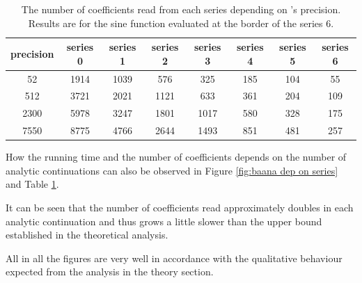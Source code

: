     \begin{table}
      \centering
      \begin{tabular}{|c||c|c|c|c|c|c|c|}
        \hline
        precision & series 0&series 1&series 2&series 3&series 4&series 5&series 6 \\ \hline
        52 &1914&1039&576&325&185&104&55 \\ \hline 
        512 &3721&2021&1121&633&361&204&109 \\ \hline
        2300 &5978&3247&1801&1017&580&328&175 \\ \hline
        7550 &8775 & 4766 & 2644 & 1493&851&481&257 \\ \hline
      \end{tabular}
      \caption{The number of coefficients read from each series depending on {\irram}'s precision. 
    Results are for the sine function evaluated at the border of the series 6.}\label{table: coefficients dep on precision} 
    \end{table}
		How the running time and the number of coefficients depends on the number of analytic continuations can also be observed in Figure \ref{fig:baana dep on series} 
    and Table \ref{table: coefficients dep on precision}.

    It can be seen that the number of coefficients read approximately doubles in each analytic continuation and thus grows 
    a little slower than the upper bound established in the theoretical analysis.

		All in all the figures are very well in accordance with the qualitative behaviour expected from the analysis in the theory section.
